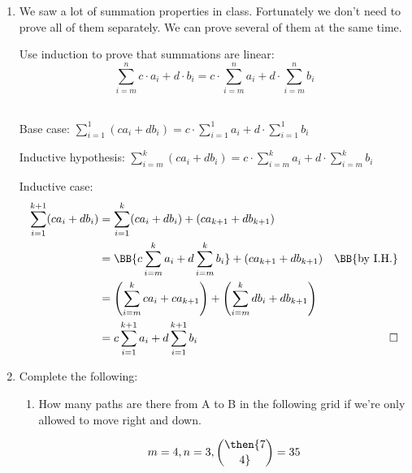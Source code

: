 \documentclass[basic, header]{nosvagor-notes}
\begin{document}
\begin{enumerate}
  \newpage %

  \item We saw a lot of summation properties in class. Fortunately we don’t
    need to prove all of them separately. We can prove several of them at the
    same time.

    Use induction to prove that summations are linear:
    \[%
      \sum_{i=m}^n c\cdot a_i + d\cdot b_i = c\cdot \sum_{i=m}^n a_i + d \cdot \sum_{i=m}^n b_i
    \]%

    \\
    Base case: \(\displaystyle
    \sum_{i=1}^{1} (ca_i + db_i) = c \cdot \sum_{i=1}^{1} a_i + d\cdot \sum_{i=1}^{1} b_i
    \)

    Inductive hypothesis: \(\displaystyle
    \sum_{i=m}^k (ca_i + db_i) = c\cdot \sum_{i=m}^k a_i + d \cdot \sum_{i=m}^k b_i
    \)

    Inductive case:
    \begin{align*}
     \sum_{i=1}^{k+1} (ca_i + db_i)
      &= \sum_{i=1}^{k} (ca_i + db_i) + (ca_{k+1} +db_{k+1} )\\
      &= \BB{c\sum_{i=m}^k a_i + d \sum_{i=m}^k b_i}
      +(ca_{k+1} +db_{k+1})
      & \text{\BB{by I.H.}} \\
      &= \left(\sum_{i=m}^k ca_i + ca_{k+1} \right) +
      \left(\sum_{i=m}^k db_i + db_{k+1} \right)\\
      &= c\sum_{i=1}^{k+1} a_i + d\sum_{i=1}^{k+1} b_i
      & \qed
    \end{align*}

  \newpage %

  \item Complete the following:
    \begin{enumerate}

      \item How many paths are there from A to B in the following grid if we’re
        only allowed to move right and down.

        \begin{center}
        \end{center}
      \[%
        m = 4, n = 3, \then {7 \choose 4} = 35
      \]%


\end{enumerate}
\end{enumerate}
\end{document}
